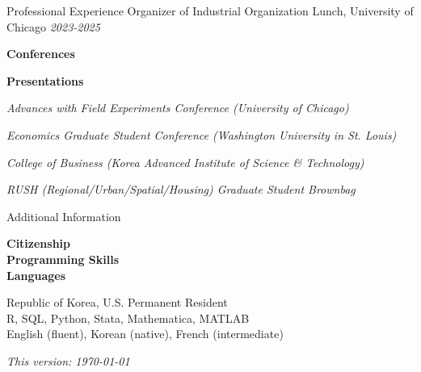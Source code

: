 \documentclass{resume} %
\begin{document}
	\begin{rSection}{Professional Experience}
		Organizer of Industrial Organization Lunch, University of Chicago \hfill {\em 2023-2025}
		
		\begin{minipage}[t]{0.2\textwidth}
			\textbf{Conferences}
			
			\textbf{Presentations}
			
		\end{minipage}
		\begin{minipage}[t]{0.8\textwidth}
			\textit{Advances with Field Experiments Conference (University of Chicago)}
			
			\textit{Economics Graduate Student Conference (Washington University in St. Louis)}
			
			\textit{College of Business (Korea Advanced Institute of Science \& Technology)}
			
			\textit{RUSH (Regional/Urban/Spatial/Housing) Graduate Student Brownbag}
			
		\end{minipage}
	
	\end{rSection}


	\begin{rSection}{Additional Information}
		\begin{minipage}[t]{0.25\textwidth}
			\textbf{Citizenship} \\
			\textbf{Programming Skills} \\
			\textbf{Languages}
		\end{minipage}
		\begin{minipage}[t]{0.75\textwidth}
			Republic of Korea, U.S. Permanent Resident \\
			R, SQL, Python, Stata, Mathematica, MATLAB \\
			English (fluent), Korean (native), French (intermediate)
		\end{minipage}
	\end{rSection}

	\vfill
	\flushright \textit{This version: \today}
\end{document}
